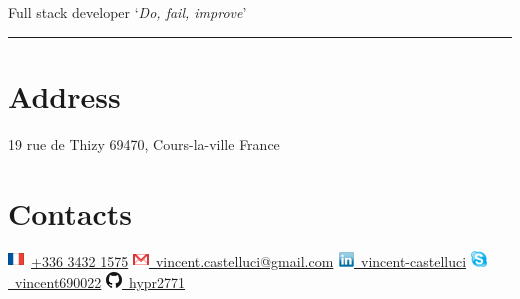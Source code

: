 \documentclass[]{friggeri-cv}
\begin{document}
      {Full stack developer}
\hfill \lq\textit{Do, fail, improve}\rq

\rule{397pt}{8pt}

\begin{aside}
  \section{Address}
  \hspace{1cm}
    19 rue de Thizy
    69470, Cours-la-ville
    France
  \section{Contacts}
  \hspace{1cm}
    \vspace{0.5mm}\includegraphics[scale=0.60]{img/france.png}~\href{tel:+33634321575}{+336 3432 1575}
    \vspace{0.5mm}\hspace{-2cm}\href{mailto:vincent.castelluci@gmail.com}{\includegraphics[scale=0.60]{img/mail.png}~vincent.castelluci@gmail.com}
    \vspace{0.5mm}\href{https://www.linkedin.com/in/vincent-castelluci-363939170}{\includegraphics[scale=0.60]{img/linkedin.png}~vincent-castelluci}
    \vspace{0.5mm}\href{skype://vincent690022?userinfo}{\includegraphics[scale=0.60]{img/skype.png}~vincent690022}
    \vspace{0.5mm}\href{https://github.com/hypr2771}{\includegraphics[scale=0.60]{img/github.png}~hypr2771}
    ~

\end{aside}
\end{document}
